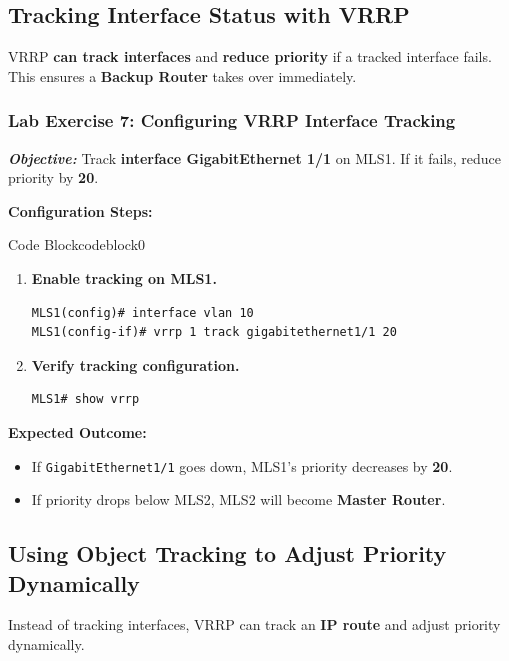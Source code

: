 \documentclass[a4paper]{book}
\begin{document}
\subsection{Tracking Interface Status with VRRP}
VRRP \textbf{can track interfaces} and \textbf{reduce priority} if a tracked interface fails. 
This ensures a \textbf{Backup Router} takes over immediately.

\subsubsection{Lab Exercise 7: Configuring VRRP Interface Tracking}
\textbf{\textit{Objective:}} Track \textbf{interface GigabitEthernet 1/1} on MLS1. If it fails, 
reduce priority by \textbf{20}.
\vspace{1.5em}

\textbf{Configuration Steps:}

\vspace{1.5em}


\begin{ocg}{Code Block}{codeblock}{0}

\vspace{0.5cm}
\begin{enumerate}
\item \textbf{Enable tracking on MLS1.}
\begin{lstlisting}
MLS1(config)# interface vlan 10
MLS1(config-if)# vrrp 1 track gigabitethernet1/1 20
\end{lstlisting}

\item \textbf{Verify tracking configuration.}
\begin{lstlisting}
MLS1# show vrrp
\end{lstlisting}
\end{enumerate}
\end{ocg}


\textbf{Expected Outcome:}
\begin{itemize}
\item If \texttt{GigabitEthernet1/1} goes down, MLS1’s priority decreases by \textbf{20}.
\item If priority drops below MLS2, MLS2 will become \textbf{Master Router}.
\end{itemize}

\subsection{Using Object Tracking to Adjust Priority Dynamically}
Instead of tracking interfaces, VRRP can track an \textbf{IP route} and adjust priority dynamically.
\end{document}
